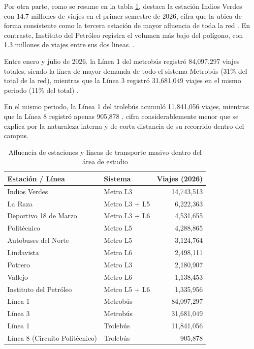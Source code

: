 Por otra parte, como se resume en la tabla \ref{tab:afluencia_transporte}, destaca la estación Indios Verdes con 14.7 millones de viajes en el primer semestre de 2026, cifra que la ubica de forma consistente como la tercera estación de mayor afluencia de toda la red \cite{stcmetro2026}. En contraste, Instituto del Petróleo registra el volumen más bajo del polígono, con 1.3 millones de viajes entre sus dos lineas. \cite{stcmetro2026}.


Entre enero y julio de 2026, la Línea 1 del metrobús registró 84,097,297 viajes totales, siendo la línea de mayor demanda de todo el sistema Metrobús (31\% del total de la red), mientras que la Línea 3 registró 31,681,049 viajes en el mismo periodo (11\% del total) \cite{semovi2026mb}.

En el mismo periodo, la Línea 1 del trolebús acumuló 11,841,056 viajes, mientras que la Línea 8 registró apenas 905,878 \cite{semovi2026tb}, cifra considerablemente menor que se explica por la naturaleza interna y de corta distancia de su recorrido dentro del campus.

\begin{table}[htbp]
\centering
\caption{Afluencia de estaciones y líneas de transporte masivo dentro del área de estudio}
\label{tab:afluencia_transporte}
\begin{tabular}{|l|l|r|}
\hline
\textbf{Estación / Línea} & \textbf{Sistema} & \textbf{Viajes (2026)} \\ \hline
Indios Verdes & Metro L3 & 14,743,513 \\ \hline
La Raza & Metro L3 + L5 & 6,222,363 \\ \hline
Deportivo 18 de Marzo & Metro L3 + L6 & 4,531,655 \\ \hline
Politécnico & Metro L5 & 4,288,865 \\ \hline
Autobuses del Norte & Metro L5 & 3,124,764 \\ \hline
Lindavista & Metro L6 & 2,498,111 \\ \hline
Potrero & Metro L3 & 2,180,907 \\ \hline
Vallejo & Metro L6 & 1,138,453 \\ \hline
Instituto del Petróleo & Metro L5 + L6 & 1,335,956 \\ \hline
Línea 1 & Metrobús & 84,097,297 \\ \hline
Línea 3 & Metrobús & 31,681,049 \\ \hline
Línea 1 & Trolebús & 11,841,056 \\ \hline
Línea 8 (Circuito Politécnico) & Trolebús & 905,878 \\ \hline
\end{tabular}
\end{table}

